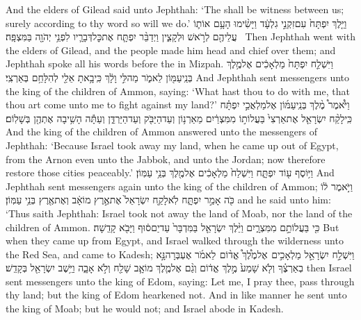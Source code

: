 {And the elders of Gilead said unto Jephthah: ‘The \lord\space shall be witness between us; surely according to thy word so will we do.’}
{וַיֵּ֤לֶךְ יִפְתָּח֙ עִם\maqqaf זִקְנֵ֣י גִלְעָ֔ד וַיָּשִׂ֨ימוּ הָעָ֥ם אוֹת֛וֹ עֲלֵיהֶ֖ם לְרֹ֣אשׁ וּלְקָצִ֑ין וַיְדַבֵּ֨ר יִפְתָּ֧ח אֶת\maqqaf כׇּל\maqqaf דְּבָרָ֛יו לִפְנֵ֥י יְהֹוָ֖ה בַּמִּצְפָּֽה׃ \petucha }
{Then Jephthah went with the elders of Gilead, and the people made him head and chief over them; and Jephthah spoke all his words before the \lord\space in Mizpah.}
{וַיִּשְׁלַ֤ח יִפְתָּח֙ מַלְאָכִ֔ים אֶל\maqqaf מֶ֥לֶךְ בְּנֵֽי\maqqaf עַמּ֖וֹן לֵאמֹ֑ר מַה\maqqaf לִּ֣י וָלָ֔ךְ כִּֽי\maqqaf בָ֥אתָ אֵלַ֖י לְהִלָּחֵ֥ם בְּאַרְצִֽי׃}
{And Jephthah sent messengers unto the king of the children of Ammon, saying: ‘What hast thou to do with me, that thou art come unto me to fight against my land?’}
{וַיֹּ֩אמֶר֩ מֶ֨לֶךְ בְּנֵֽי\maqqaf עַמּ֜וֹן אֶל\maqqaf מַלְאֲכֵ֣י יִפְתָּ֗ח כִּֽי\maqqaf לָקַ֨ח יִשְׂרָאֵ֤ל אֶת\maqqaf אַרְצִי֙ בַּעֲלוֹת֣וֹ מִמִּצְרַ֔יִם מֵאַרְנ֥וֹן וְעַד\maqqaf הַיַּבֹּ֖ק וְעַד\maqqaf הַיַּרְדֵּ֑ן וְעַתָּ֕ה הָשִׁ֥יבָה אֶתְהֶ֖ן בְּשָׁלֽוֹם׃}
{And the king of the children of Ammon answered unto the messengers of Jephthah: ‘Because Israel took away my land, when he came up out of Egypt, from the Arnon even unto the Jabbok, and unto the Jordan; now therefore restore those cities peaceably.’}
{וַיּ֥וֹסֶף ע֖וֹד יִפְתָּ֑ח וַיִּשְׁלַח֙ מַלְאָכִ֔ים אֶל\maqqaf מֶ֖לֶךְ בְּנֵ֥י עַמּֽוֹן׃}
{And Jephthah sent messengers again unto the king of the children of Ammon;}
{וַיֹּ֣אמֶר ל֔וֹ כֹּ֖ה אָמַ֣ר יִפְתָּ֑ח לֹֽא\maqqaf לָקַ֤ח יִשְׂרָאֵל֙ אֶת\maqqaf אֶ֣רֶץ מוֹאָ֔ב וְאֶת\maqqaf אֶ֖רֶץ בְּנֵ֥י עַמּֽוֹן׃}
{and he said unto him: ‘Thus saith Jephthah: Israel took not away the land of Moab, nor the land of the children of Ammon.}
{כִּ֖י בַּעֲלוֹתָ֣ם מִמִּצְרָ֑יִם וַיֵּ֨לֶךְ יִשְׂרָאֵ֤ל בַּמִּדְבָּר֙ עַד\maqqaf יַם\maqqaf ס֔וּף וַיָּבֹ֖א קָדֵֽשָׁה׃}
{But when they came up from Egypt, and Israel walked through the wilderness unto the Red Sea, and came to Kadesh;}
{וַיִּשְׁלַ֣ח יִשְׂרָאֵ֣ל מַלְאָכִ֣ים \pasek  אֶל\maqqaf מֶ֩לֶךְ֩ אֱד֨וֹם \pasek  לֵאמֹ֜ר אֶעְבְּרָה\maqqaf נָּ֣א בְאַרְצֶ֗ךָ וְלֹ֤א שָׁמַע֙ מֶ֣לֶךְ אֱד֔וֹם וְגַ֨ם אֶל\maqqaf מֶ֧לֶךְ מוֹאָ֛ב שָׁלַ֖ח וְלֹ֣א אָבָ֑ה וַיֵּ֥שֶׁב יִשְׂרָאֵ֖ל בְּקָדֵֽשׁ׃}
{then Israel sent messengers unto the king of Edom, saying: Let me, I pray thee, pass through thy land; but the king of Edom hearkened not. And in like manner he sent unto the king of Moab; but he would not; and Israel abode in Kadesh.}
